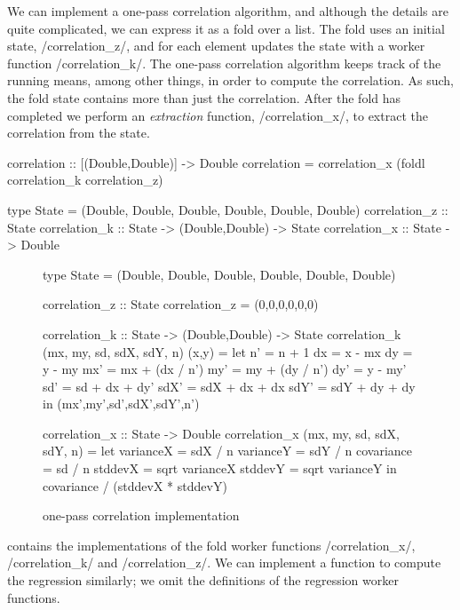 We can implement a one-pass correlation algorithm, and although the details are quite complicated, we can express it as a fold over a list.
The fold uses an initial state, \Hs/correlation_z/, and for each element updates the state with a worker function \Hs/correlation_k/.
The one-pass correlation algorithm keeps track of the running means, among other things, in order to compute the correlation.
As such, the fold state contains more than just the correlation.
After the fold has completed we perform an \emph{extraction} function, \Hs/correlation_x/, to extract the correlation from the state.

\begin{haskell}
correlation :: [(Double,Double)] -> Double
correlation = correlation_x (foldl correlation_k correlation_z)

type State = (Double, Double, Double, Double, Double, Double)
correlation_z :: State
correlation_k :: State -> (Double,Double) -> State
correlation_x :: State -> Double
\end{haskell}

\begin{figure}
\begin{haskell}
type State = (Double, Double, Double, Double, Double, Double)

correlation_z :: State
correlation_z = (0,0,0,0,0,0)

correlation_k :: State -> (Double,Double) -> State
correlation_k (mx, my, sd, sdX, sdY, n) (x,y) =
 let n'   = n   + 1
     dx   = x   - mx
     dy   = y   - my
     mx'  = mx  + (dx / n')
     my'  = my  + (dy / n')
     dy'  = y   - my'
     sd'  = sd  + dx + dy'
     sdX' = sdX + dx + dx
     sdY' = sdY + dy + dy
 in (mx',my',sd',sdX',sdY',n')

correlation_x :: State -> Double
correlation_x (mx, my, sd, sdX, sdY, n) =
  let varianceX  = sdX / n
      varianceY  = sdY / n
      covariance = sd  / n
      stddevX = sqrt varianceX
      stddevY = sqrt varianceY
  in covariance / (stddevX * stddevY)
\end{haskell}
\caption{one-pass correlation implementation}
\label{figs/impl/correlation}
\end{figure}

 contains the implementations of the fold worker functions \Hs/correlation_x/, \Hs/correlation_k/ and \Hs/correlation_z/.
We can implement a function to compute the regression similarly; we omit the definitions of the regression worker functions.

